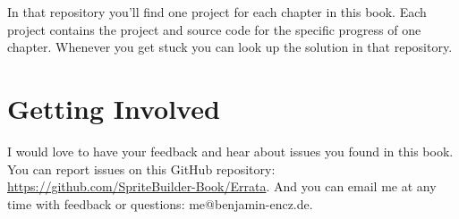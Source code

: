 In that repository you'll find one project for each chapter in this book. Each
project contains the \SB{} project and source code for the specific progress of
one chapter. Whenever you get stuck you can look up the solution in that
repository.

\section{Getting Involved}
I would love to have your feedback and hear about issues you found in this book.
You can report issues on this GitHub repository:
\url{https://github.com/SpriteBuilder-Book/Errata}. And you can email me at any
time with feedback or questions: me@benjamin-encz.de.